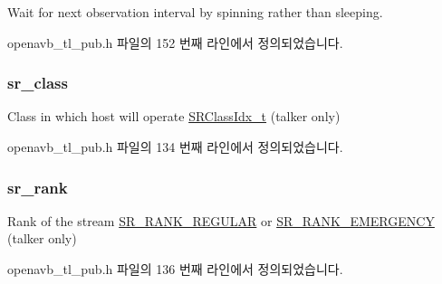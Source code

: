 Wait for next observation interval by spinning rather than sleeping. 



openavb\+\_\+tl\+\_\+pub.\+h 파일의 152 번째 라인에서 정의되었습니다.

\subsubsection[{\texorpdfstring{sr\+\_\+class}{sr_class}}]{ sr\+\_\+class}\hypertarget{structopenavb__tl__cfg__t_a39d4e73b306d801de38536c43ef7a5e8}{}\label{structopenavb__tl__cfg__t_a39d4e73b306d801de38536c43ef7a5e8}


Class in which host will operate \hyperlink{openavb__types__base__pub_8h_a4d8ccbeaf8ad040d8880e8971fc62752}{S\+R\+Class\+Idx\+\_\+t} (talker only) 



openavb\+\_\+tl\+\_\+pub.\+h 파일의 134 번째 라인에서 정의되었습니다.

\subsubsection[{\texorpdfstring{sr\+\_\+rank}{sr_rank}}]{ sr\+\_\+rank}\hypertarget{structopenavb__tl__cfg__t_aec168f739a62e7d1167959b587d0a50b}{}\label{structopenavb__tl__cfg__t_aec168f739a62e7d1167959b587d0a50b}


Rank of the stream \hyperlink{openavb__types__base__pub_8h_ae2247245210ff7d9b305530e79921b04}{S\+R\+\_\+\+R\+A\+N\+K\+\_\+\+R\+E\+G\+U\+L\+AR} or \hyperlink{openavb__types__base__pub_8h_afc788727fb40393561024641cee8f6c8}{S\+R\+\_\+\+R\+A\+N\+K\+\_\+\+E\+M\+E\+R\+G\+E\+N\+CY} (talker only) 



openavb\+\_\+tl\+\_\+pub.\+h 파일의 136 번째 라인에서 정의되었습니다.

